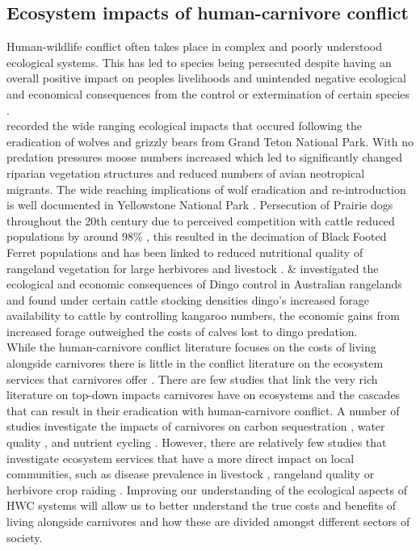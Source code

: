 \subsection{Ecosystem impacts of human-carnivore conflict}
Human-wildlife conflict often takes place in complex and poorly understood ecological systems. This has led to species being persecuted despite having an overall positive impact on peoples livelihoods and unintended negative ecological and economical consequences from the control or extermination of certain species \citep{Dickman2010b,Prowse2014}.\\

\citet{Berger2001} recorded the wide ranging ecological impacts that occured following the eradication of wolves and grizzly bears from Grand Teton National Park. With no predation pressures moose numbers increased which led to significantly changed riparian vegetation structures and reduced numbers of avian neotropical migrants. The wide reaching implications of wolf eradication and re-introduction is well documented in Yellowstone National Park \citep{Ripple2012}. Persecution of Prairie dogs throughout the 20th century due to perceived competition with cattle reduced populations by around 98\% \citep{Kotliar1999,Whicker1988}, this resulted in the decimation of Black Footed Ferret populations \citep{Kotliar1999} and has been linked to reduced nutritional quality of rangeland vegetation for large herbivores and livestock \citep{Whicker1988}. \citet{Prowse2014} \& \citet{Allen2015a} investigated the ecological and economic consequences of Dingo control in Australian rangelands and found under certain cattle stocking densities dingo's increased forage availability to cattle by controlling kangaroo numbers, the economic gains from increased forage outweighed the costs of calves lost to dingo predation.\\

While the human-carnivore conflict literature focuses on the costs of living alongside carnivores there is little in the conflict literature on the ecosystem services that carnivores offer \citep{Ripple2014a}. There are few studies that link the very rich literature on top-down impacts carnivores have on ecosystems and the cascades that can result in their eradication \citep{Ripple2014,Crooks1999a,Ripple2014a} with human-carnivore conflict. A number of studies investigate the impacts of carnivores on carbon sequestration \citep{Wilmers2012,Schmitz2014}, water quality \citep{Beschta2012a}, and nutrient cycling \citep{Wilmers2003}. However, there are relatively few studies that investigate ecosystem services that have a more direct impact on local communities, such as disease prevalence in livestock \citep{Packer2003}, rangeland quality \citep{Prowse2014,Allen2015a} or herbivore crop raiding \citep{brashares2010ecological}. Improving our understanding of the ecological aspects of HWC systems will allow us to better understand the true costs and benefits of living alongside carnivores and how these are divided amongst different sectors of society.

